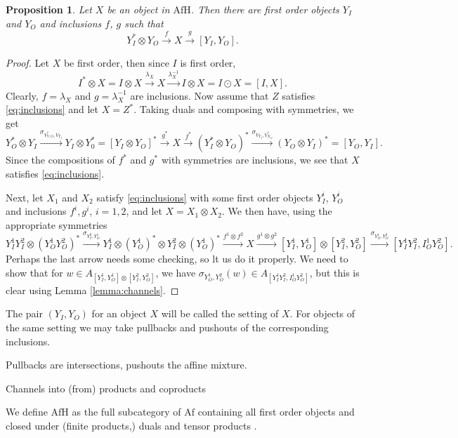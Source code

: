\documentclass[12pt]{article}
\newtheorem{prop}{Proposition}
\theoremstyle{definition}
\theoremstyle{remark}
\def\type{\mathrm {setting}}
\def \Afh{\mathrm{AfH}}
\def \Af{\mathrm{Af}}
\begin{document}
\begin{prop}\label{prop:afh} Let $X$ be an object in $\Afh$. Then there are  first order
objects $Y_I$ and $Y_O$ and inclusions $f$, $g$ such that
\begin{equation}\label{eq:inclusions}
Y_I^*\otimes Y_O \xrightarrow{f} X\xrightarrow{g} [Y_I,Y_O].
\end{equation}


\end{prop}

\begin{proof} Let $X$ be first order, then since $I$ is first order,
\[
I^*\otimes X=I\otimes X \xrightarrow{\lambda_X} X\xrightarrow{\lambda^{-1}_X} I\otimes
X=I\odot X=[I,X].
\]
Clearly, $f=\lambda_X$ and $g=\lambda^{-1}_X$ are inclusions. Now assume that $Z$
satisfies \eqref{eq:inclusions} and let $X=Z^*$. Taking duals and composing with
symmetries, we get
\[
Y_O^*\otimes Y_I\xrightarrow{\sigma_{V_{Y,O}^*,V_{Y_I}}} Y_I\otimes Y_0^*=[Y_I\otimes
Y_O]^*\xrightarrow{g^*} X\xrightarrow{f^*} (Y_I^*\otimes
Y_O)^*\xrightarrow{\sigma_{V_{Y_I},V_{X_O}^*}} (Y_O\otimes Y_I)^*=[Y_O,Y_I].
\]
Since the compositions of $f^*$ and $g^*$ with symmetries are inclusions, we see that $X$
satisfies \eqref{eq:inclusions}.

Next, let $X_1$ and $X_2$ satisfy \eqref{eq:inclusions}  with some first order objects $Y_I^i$, $Y_O^i$ and
inclusions $f^i,g^i$, $i=1,2$, and let $X=X_1\otimes X_2$. We then have, using the
appropriate symmetries
\[
Y_I^1Y_I^2\otimes (Y_O^1Y_O^2)^*\xrightarrow{\sigma_{Y_I^2,Y_O^1}} Y_I^1\otimes
(Y_O^1)^*\otimes Y_I^2\otimes (Y_O^1)^*\xrightarrow{f^1\otimes f^2} X
\xrightarrow{g^1\otimes g^2} [Y_I^1,Y_O^1]\otimes
[Y_I^2,Y_O^2]\xrightarrow{\sigma_{Y_O^1,Y_O^2}}[Y_I^1Y_I^2,I_O^1Y_O^2].
\]
Perhaps the last arrow needs some checking, so lt us do it properly. We need to show that
for $w\in A_{[Y_I^1,Y_O^1]\otimes
[Y_I^2,Y_O^2]}$, we have $\sigma_{Y_O^1,Y_O^2}(w)\in A_{[Y_I^1Y_I^2,I_O^1Y_O^2]}$, but
this is clear using Lemma \ref{lemma:channels}.

\end{proof}

The pair $(Y_I,Y_O)$ for an object $X$ will be called the $\type$ of $X$. For objects of
the same $\type$ we may take
pullbacks and pushouts of the  corresponding inclusions.




Pullbacks are intersections, pushouts the affine mixture.

Channels into (from) products and coproducts

We define $\Afh$ as the full subcategory of $\Af$ containing all first order objects and
closed under (finite products,) duals and  tensor products . 
\end{document}
